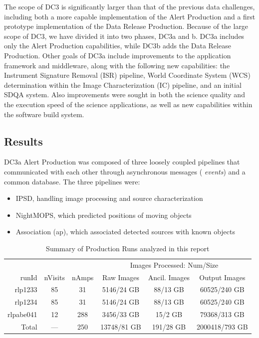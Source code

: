 The scope of DC3 is significantly larger than that of the previous
data challenges, including both a more capable implementation of the
Alert Production and a first prototype implementation of the Data
Release Production.  Because of the large scope of DC3, we have
divided it into two phases, DC3a and b.  DC3a includes only the Alert
Production capabilities, while DC3b adds the Data Release Production.
Other goals of DC3a include improvements to the application framework
and middleware, along with the following new capabilities: the
Instrument Signature Removal (ISR) pipeline, World Coordinate System
(WCS) determination within the Image Characterization (IC) pipeline,
and an initial SDQA system. Also improvements were sought in both the
science quality and the execution speed of the science applications,
as well as new capabilities within the software build system.

\subsection*{Results}

DC3a Alert Production was composed of three loosely coupled pipelines
that communicated with each other through asynchronous messages ({\it
events}) and a common database.  The three pipelines were:
\begin{itemize}
\item IPSD, handling image processing and source characterization
\item NightMOPS, which predicted positions of moving objects
\item Association (ap), which associated detected sources with known objects
\end{itemize}

\begin{table}[bp]
\centering
\caption{Summary of Production Runs analyzed in this report
\label{tbl:runsummary}}
\vspace{\baselineskip}
\begin{tabular}{rccccc}
\hline\hline
          &         &       & \multicolumn{3}{c}{Images Processed: Num/Size} \\
runId     & nVisits & nAmps & Raw Images & Ancil. Images & Output Images \\ \hline
rlp1233   & 85      & 31  & 5146/24 GB    & 88/13 GB       & 60525/240 GB \\ 
rlp1234   & 85      & 31  & 5146/24 GB    & 88/13 GB       & 60525/240 GB \\ 
rlpabe041 & 12      & 288 & 3456/33 GB    & 15/2 GB        & 79368/313 GB \\ \hline
Total     & ---     & 250 & 13748/81 GB   & 191/28 GB      & 2000418/793 GB \\ \hline
\end{tabular}
\end{table}

